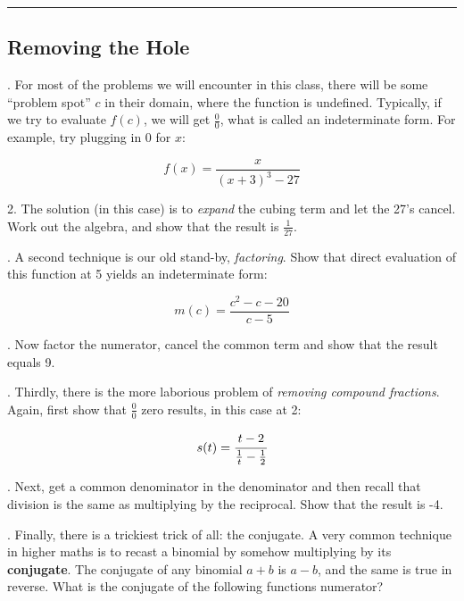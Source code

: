 \renewcommand{\columnseprule}{1.5pt}
\begin{multicols*}{2}
\noindent
\rule[0.5\baselineskip]{0.5\textwidth}{1pt}

\noindent
\subsection{Removing the Hole}
. For most of the problems we will encounter in this class, there will be some ``problem spot''
$c$ in their domain, where the function is undefined.  Typically, if we try to evaluate $f(c)$,
we will get $\frac{0}{0}$, what is called an \gls{indeterminate form}.  For example, try plugging
in 0 for $x$:

$$
f(x)=\frac{x}{(x+3)^3-27}
$$
\noindent

\vspace{1cm}

2. The solution (in this case) is to \emph{expand} the cubing term and let the 27's cancel.  
Work out the algebra, and show that the result
is $\frac{1}{27}$.

\vspace{2cm}

. A second technique is our old stand-by, \emph{factoring}.  Show that direct evaluation of this
function at 5 yields an indeterminate form:

$$
m(c) = \frac{c^2-c-20}{c-5}
$$

\vspace{1cm}
.  Now factor the numerator, cancel the common term and show that the result equals 9.

\vspace{2cm}

. Thirdly, there is the more laborious problem of \emph{removing compound fractions}.  Again,
first show that $\frac{0}{0}$ zero results, in this case at 2:

$$
s(t)=\cfrac{t-2}{\frac{1}{t}-\frac{1}{2}}
$$

\vspace{1cm}

.  Next, get a common denominator in the denominator and then recall that division is the 
same as multiplying by the reciprocal.  Show that
the result is -4.

\vspace{2cm}

. Finally, there is a trickiest trick of all: the conjugate.  A very common technique in higher maths
is to recast a binomial by somehow multiplying by its \textbf{conjugate}.  
The conjugate of any
binomial $a+b$ is $a-b$, and the same is true in reverse.  What is the conjugate of the following
functions numerator?


\end{multicols*}
